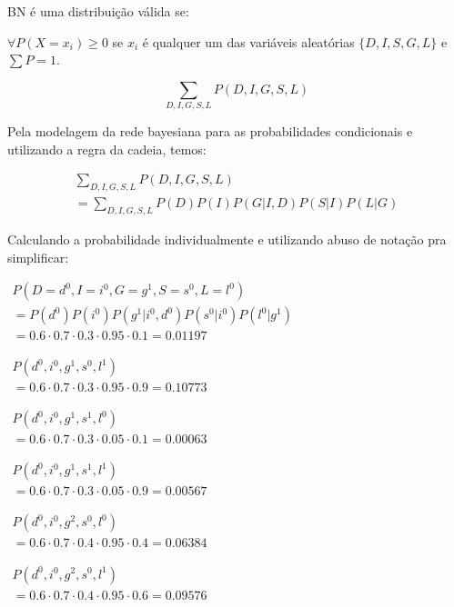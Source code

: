 BN é uma distribuição válida se:

$\forall P(X=x_i) \ge 0$ se $x_i$ é qualquer um das variáveis aleatórias $\{D, I, S, G, L\}$ e $\sum P = 1$.

\[\displaystyle \sum_{D, I, G, S, L} P(D, I, G, S, L)\]

Pela modelagem da rede bayesiana para as probabilidades condicionais e utilizando a regra da cadeia, temos:

\[\begin{array}{l}
    \displaystyle \sum_{D, I, G, S, L} P(D, I, G, S, L) \\
    \displaystyle = \sum_{D, I, G, S, L} P(D)P(I)P(G|I,D)P(S|I)P(L|G)
\end{array}\]

Calculando a probabilidade individualmente e utilizando abuso de notação pra simplificar:

$\begin{array}{l}
    P(D = d^0, I = i^0, G = g^1, S = s^0, L = l^0) \\
    = P(d^0) P(i^0) P(g^1 | i^0, d^0) P(s^0 | i^0) P(l^0 | g^1) \\
    = 0.6 \cdot 0.7 \cdot 0.3 \cdot 0.95 \cdot 0.1 = 0.01197
\end{array}$

$\begin{array}{l}
    P(d^0, i^0, g^1, s^0, l^1) \\
    = 0.6 \cdot 0.7 \cdot 0.3 \cdot 0.95 \cdot 0.9 = 0.10773
\end{array}$

$\begin{array}{l}
    P(d^0, i^0, g^1, s^1, l^0) \\
    = 0.6 \cdot 0.7 \cdot 0.3 \cdot 0.05 \cdot 0.1 = 0.00063
\end{array}$

$\begin{array}{l}
    P(d^0, i^0, g^1, s^1, l^1) \\
    = 0.6 \cdot 0.7 \cdot 0.3 \cdot 0.05 \cdot 0.9 = 0.00567
\end{array}$

$\begin{array}{l}
    P(d^0, i^0, g^2, s^0, l^0) \\
    = 0.6 \cdot 0.7 \cdot 0.4 \cdot 0.95 \cdot 0.4 = 0.06384
\end{array}$

$\begin{array}{l}
    P(d^0, i^0, g^2, s^0, l^1) \\
    = 0.6 \cdot 0.7 \cdot 0.4 \cdot 0.95 \cdot 0.6 = 0.09576
\end{array}$

